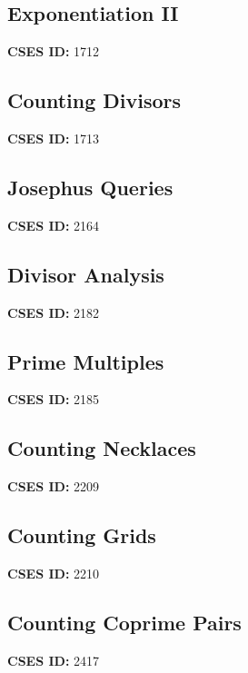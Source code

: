 \documentclass[10pt, a4paper, twocolumn, landscape]{article}
\begin{document}
\subsection{Exponentiation II}
\textbf{CSES ID:} 1712 \\

\vspace{0.2cm}
\subsection{Counting Divisors}
\textbf{CSES ID:} 1713 \\

\vspace{0.2cm}
\subsection{Josephus Queries}
\textbf{CSES ID:} 2164 \\

\vspace{0.2cm}
\subsection{Divisor Analysis}
\textbf{CSES ID:} 2182 \\

\vspace{0.2cm}
\subsection{Prime Multiples}
\textbf{CSES ID:} 2185 \\

\vspace{0.2cm}
\subsection{Counting Necklaces}
\textbf{CSES ID:} 2209 \\

\vspace{0.2cm}
\subsection{Counting Grids}
\textbf{CSES ID:} 2210 \\

\vspace{0.2cm}
\subsection{Counting Coprime Pairs}
\textbf{CSES ID:} 2417 \\

\vspace{0.2cm}
\end{document}

